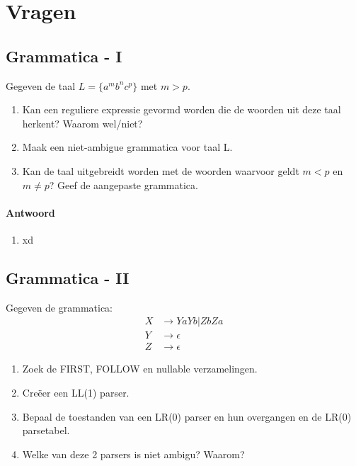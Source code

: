 \documentclass{report}
\newcommand{\answer}[1]{
		\subsubsection*{Antwoord}
			#1
}
\begin{document}
	\tableofcontents
	\chapter{Vragen}
	\newpage
\section{Grammatica - I}
	Gegeven de taal $L = \{a^mb^nc^p\}$ met $m > p$.
	\begin{enumerate}
		\item Kan een reguliere expressie gevormd worden die de woorden uit deze taal herkent? Waarom wel/niet?
		\item Maak een niet-ambigue grammatica voor taal L.
		\item Kan de taal uitgebreidt worden met de woorden waarvoor geldt $m < p$ en $m \neq p$? Geef de aangepaste grammatica.
	\end{enumerate} 

	\answer{
		\begin{enumerate}
			\item xd

		\end{enumerate}
	}


\newpage
\section{Grammatica - II}
Gegeven de grammatica:
\begin{align*}
	X & \rightarrow YaYb|ZbZa \\
	Y & \rightarrow \epsilon \\
	Z & \rightarrow \epsilon
\end{align*}
\begin{enumerate}
	\item Zoek de FIRST, FOLLOW en nullable verzamelingen.
	\item Creëer een LL(1) parser.
	\item Bepaal de toestanden van een LR(0) parser en hun overgangen en de LR(0) parsetabel.
	\item Welke van deze 2 parsers is niet ambigu? Waarom? 
\end{enumerate}
\end{document}
